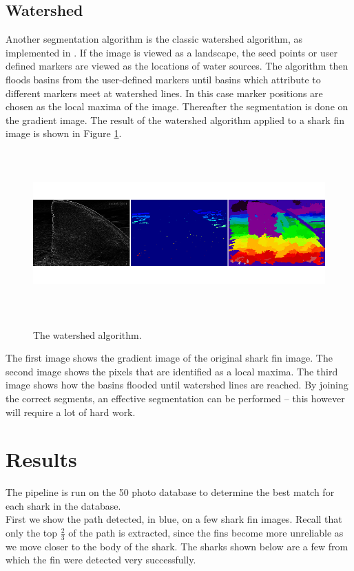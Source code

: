\documentclass[a4paper,10pt]{article}
\begin{document}
\subsection{Watershed}
\label{watershed}
Another segmentation algorithm is the classic watershed algorithm, as
implemented in \cite{scikit}.  If the image is viewed
  as a landscape, the seed points or user defined markers are viewed as the locations of water sources.  The algorithm then floods
basins from the user-defined markers until basins which attribute to different
markers meet at watershed lines.  In this case marker positions are chosen as
the local maxima of the image.  Thereafter the segmentation is done on the
gradient image.  The result of the watershed algorithm applied to a shark fin
image is shown in Figure \ref{fig3}.

\begin{figure}[H]
\centering
\includegraphics[width=5in,height=2.5in]{watershed.png} 
\label{fig3}
\caption{The watershed algorithm\cite{scikit}.}
\end{figure}

\noindent The first image shows the gradient image of the original shark fin
image.  The second image shows the pixels that are identified as a local maxima.
 The third image shows how the basins flooded until watershed lines are reached.
 By joining the correct segments, an effective segmentation can be performed -- this however will require
 a lot of hard work.

\newpage
\section{Results}
The pipeline is run on the 50 photo database to determine the best match for each shark in the database.  \\ 

First we show the path detected, in blue, on a few shark fin images.  Recall that only the top $\frac{2}{3}$ of the path is extracted, 
since the fins become more unreliable as we move closer to the body of the shark.  The sharks shown below are a few from which the fin were detected very successfully.  \\
\end{document}

